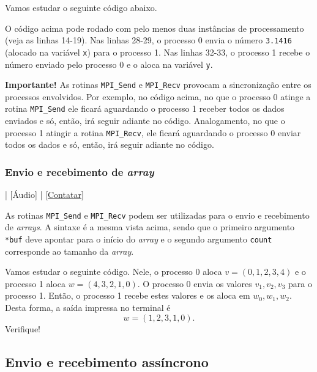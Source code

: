 Vamos estudar o seguinte código abaixo.



O código acima pode rodado com pelo menos duas instâncias de processamento (veja as linhas 14-19). Nas linhas 28-29, o processo 0 envia o número \verb+3.1416+ (alocado na variável \verb+x+) para o processo 1. Nas linhas 32-33, o processo 1 recebe o número enviado pelo processo 0 e o aloca na variável \verb+y+.

{\bf Importante!} As rotinas \verb+MPI_Send+ e \verb+MPI_Recv+ provocam a sincronização entre os processos envolvidos. Por exemplo, no código acima, no que o processo 0 atinge a rotina \verb+MPI_Send+ ele ficará aguardando o processo 1 receber todos os dados enviados e só, então, irá seguir adiante no código. Analogamento, no que o processo 1 atingir a rotina \verb+MPI_Recv+, ele ficará aguardando o processo 0 enviar todos os dados e só, então, irá seguir adiante no código.

\subsubsection {Envio e recebimento de {\it array}}

\begin{flushright}
  [Vídeo] | [Áudio] | \href{https://phkonzen.github.io/notas/contato.html}{[Contatar]}
\end{flushright}

As rotinas \verb+MPI_Send+ e \verb+MPI_Recv+ podem ser utilizadas para o envio e recebimento de {\it arrays}. A sintaxe é a mesma vista acima, sendo que o primeiro argumento \verb+*buf+ deve apontar para o início do {\it array} e o segundo argumento \verb+count+ corresponde ao tamanho da {\it array}.

Vamos estudar o seguinte código. Nele, o processo 0 aloca $v = (0,1,2,3,4)$ e o processo 1 aloca $w = (4,3,2,1,0)$. O processo 0 envia os valores $v_1, v_2, v_3$ para o processo 1. Então, o processo 1 recebe estes valores e os aloca em $w_0, w_1, w_2$. Desta forma, a saída impressa no terminal é
\begin{equation}
  w = (1, 2, 3, 1, 0).
\end{equation}
Verifique!




\subsection {Envio e recebimento assíncrono}


